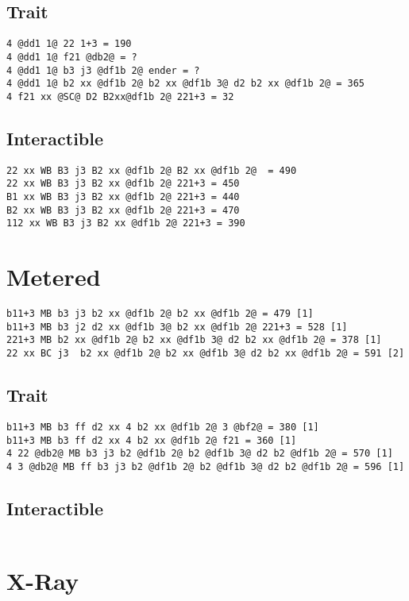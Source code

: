 \documentclass[main.tex]{subfiles}
\begin{document}
\subsection{Trait}

\begin{lstlisting}[language=FG]
4 @dd1 1@ 22 1+3 = 190
4 @dd1 1@ f21 @db2@ = ?
4 @dd1 1@ b3 j3 @df1b 2@ ender = ?
4 @dd1 1@ b2 xx @df1b 2@ b2 xx @df1b 3@ d2 b2 xx @df1b 2@ = 365  
4 f21 xx @SC@ D2 B2xx@df1b 2@ 221+3 = 32
\end{lstlisting}


\subsection{Interactible}
\begin{lstlisting}[language=FG]
22 xx WB B3 j3 B2 xx @df1b 2@ B2 xx @df1b 2@  = 490
22 xx WB B3 j3 B2 xx @df1b 2@ 221+3 = 450
B1 xx WB B3 j3 B2 xx @df1b 2@ 221+3 = 440
B2 xx WB B3 j3 B2 xx @df1b 2@ 221+3 = 470
112 xx WB B3 j3 B2 xx @df1b 2@ 221+3 = 390
\end{lstlisting}

\section{Metered}


\begin{lstlisting}[language=FG]
b11+3 MB b3 j3 b2 xx @df1b 2@ b2 xx @df1b 2@ = 479 [1]
b11+3 MB b3 j2 d2 xx @df1b 3@ b2 xx @df1b 2@ 221+3 = 528 [1]
221+3 MB b2 xx @df1b 2@ b2 xx @df1b 3@ d2 b2 xx @df1b 2@ = 378 [1]
22 xx BC j3  b2 xx @df1b 2@ b2 xx @df1b 3@ d2 b2 xx @df1b 2@ = 591 [2]
\end{lstlisting}

\subsection{Trait}
\begin{lstlisting}[language=FG]
b11+3 MB b3 ff d2 xx 4 b2 xx @df1b 2@ 3 @bf2@ = 380 [1]
b11+3 MB b3 ff d2 xx 4 b2 xx @df1b 2@ f21 = 360 [1]
4 22 @db2@ MB b3 j3 b2 @df1b 2@ b2 @df1b 3@ d2 b2 @df1b 2@ = 570 [1]
4 3 @db2@ MB ff b3 j3 b2 @df1b 2@ b2 @df1b 3@ d2 b2 @df1b 2@ = 596 [1]
\end{lstlisting}


\subsection{Interactible}
\begin{lstlisting}[language=FG]

\end{lstlisting}

\section{X-Ray}
\begin{lstlisting}[language=FG]

\end{lstlisting}
\end{document}
